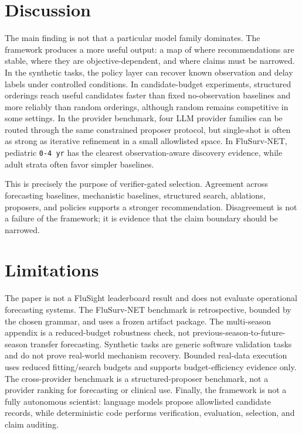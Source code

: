 \section{Discussion}

The main finding is not that a particular model family dominates. The
framework produces a more useful output: a map of where recommendations are
stable, where they are objective-dependent, and where claims must be narrowed.
In the synthetic tasks, the policy layer can recover known observation and
delay labels under controlled conditions. In candidate-budget experiments,
structured orderings reach useful candidates faster than fixed
no-observation baselines and more reliably than random orderings, although
random remains competitive in some settings. In the provider benchmark, four
LLM provider families can be routed through the same constrained proposer
protocol, but single-shot is often as strong as iterative refinement in a
small allowlisted space. In FluSurv-NET, pediatric \texttt{0-4 yr} has the
clearest observation-aware discovery evidence, while adult strata often favor
simpler baselines.

This is precisely the purpose of verifier-gated selection. Agreement across
forecasting baselines, mechanistic baselines, structured search, ablations,
proposers, and policies supports a stronger recommendation. Disagreement is
not a failure of the framework; it is evidence that the claim boundary should
be narrowed.

\section{Limitations}

The paper is not a FluSight leaderboard result and does not evaluate
operational forecasting systems. The FluSurv-NET benchmark is retrospective,
bounded by the chosen grammar, and uses a frozen artifact package. The
multi-season appendix is a reduced-budget robustness check, not
previous-season-to-future-season transfer forecasting. Synthetic tasks are
generic software validation tasks and do not prove real-world mechanism
recovery. Bounded real-data execution uses reduced fitting/search budgets and
supports budget-efficiency evidence only. The cross-provider benchmark is a
structured-proposer benchmark, not a provider ranking for forecasting or
clinical use. Finally, the framework is not a fully autonomous scientist:
language models propose allowlisted candidate records, while deterministic
code performs verification, evaluation, selection, and claim auditing.

